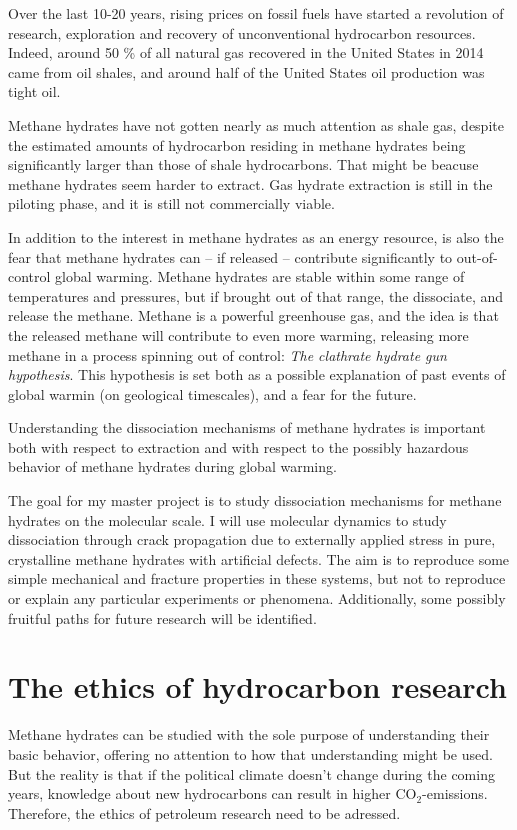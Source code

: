 Over the last 10-20 years, rising prices on fossil fuels have started a revolution of research, exploration and recovery of unconventional hydrocarbon resources. Indeed, around 50 \% of all natural gas recovered in the United States in 2014 came from oil shales, and around half of the United States oil production was tight oil.

Methane hydrates have not gotten nearly as much attention as shale gas, despite the estimated amounts of hydrocarbon residing in methane hydrates being significantly larger than those of shale hydrocarbons. That might be beacuse methane hydrates seem harder to extract. Gas hydrate extraction is still in the piloting phase, and it is still not commercially viable.

In addition to the interest in methane hydrates as an energy resource, is also the fear that methane hydrates can -- if released -- contribute significantly to out-of-control global warming. Methane hydrates are stable within some range of temperatures and pressures, but if brought out of that range, the dissociate, and release the methane. Methane is a powerful greenhouse gas, and the idea is that the released methane will contribute to even more warming, releasing more methane in a process spinning out of control: \emph{The clathrate hydrate gun hypothesis}. This hypothesis is set both as a possible explanation of past events of global warmin (on geological timescales), and a fear for the future.

Understanding the dissociation mechanisms of methane hydrates is important both with respect to extraction and with respect to the possibly hazardous behavior of methane hydrates during global warming. 

The goal for my master project is to study dissociation mechanisms for methane hydrates on the molecular scale. I will use molecular dynamics to study dissociation through crack propagation due to externally applied stress in pure, crystalline methane hydrates with artificial defects. The aim is to reproduce some simple mechanical and fracture properties in these systems, but not to reproduce or explain any particular experiments or phenomena. Additionally, some possibly fruitful paths for future research will be identified.

\section{The ethics of hydrocarbon research}
Methane hydrates can be studied with the sole purpose of understanding their basic behavior, offering no attention to how that understanding might be used. But the reality is that if the political climate doesn't change during the coming years, knowledge about new hydrocarbons can result in higher CO$_2$-emissions. Therefore, the ethics of petroleum research need to be adressed.

